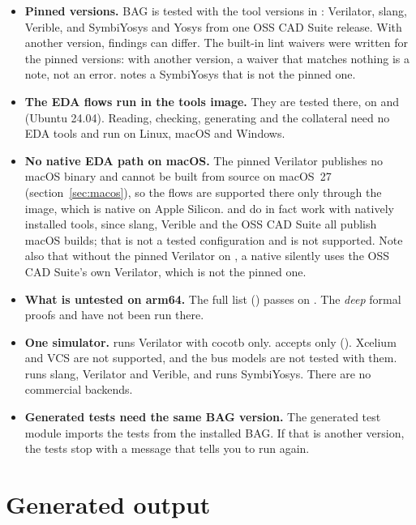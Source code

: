 \begin{itemize}
\item \textbf{Pinned versions.} BAG is tested with the tool versions in
  : Verilator, slang, Verible, and SymbiYosys and Yosys from one OSS CAD
  Suite release. With another version, findings can differ. The built-in lint waivers
  were written for the pinned versions: with another version, a waiver that matches
  nothing is a note, not an error.  notes a SymbiYosys that is not the
  pinned one.
\item \textbf{The EDA flows run in the tools image.} They are tested there, on
   and  (Ubuntu 24.04). Reading, checking,
  generating and the collateral need no EDA tools and run on Linux, macOS and Windows.
\item \textbf{No native EDA path on macOS.} The pinned Verilator publishes no macOS
  binary and cannot be built from source on macOS~27 (section~\ref{sec:macos}), so the
  flows are supported there only through the image, which is native on Apple Silicon.
   and  do in fact work with natively installed tools,
  since slang, Verible and the OSS CAD Suite all publish macOS builds; that is not a
  tested configuration and is not supported. Note also that without the pinned Verilator
  on , a native  silently uses the OSS CAD Suite's own
  Verilator, which is not the pinned one.
\item \textbf{What is untested on arm64.} The full list ()
  passes on . The \emph{deep} formal proofs and 
  have not been run there.
\item \textbf{One simulator.}  runs Verilator with cocotb only.
   accepts only  (). Xcelium and
  VCS are not supported, and the bus models are not tested with them.  runs
  slang, Verilator and Verible, and  runs SymbiYosys. There are no
  commercial backends.
\item \textbf{Generated tests need the same BAG version.} The generated test module
  imports the tests from the installed BAG. If that is another version, the tests stop
  with a message that tells you to run  again.
\end{itemize}

\section{Generated output}
\label{sec:limits-output}

